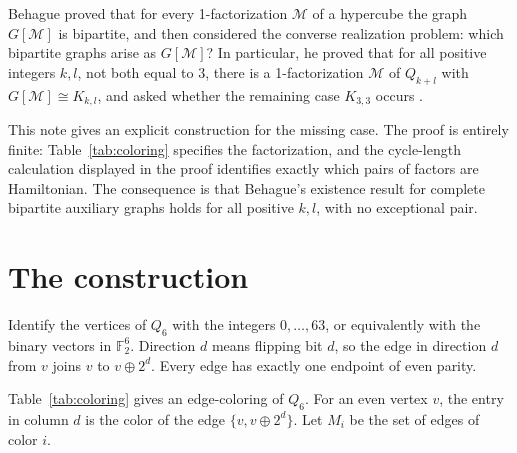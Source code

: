 \documentclass[11pt]{article}
\newcommand{\Q}{Q_6}
\newcommand{\M}{\mathcal M}
\begin{document}
Behague proved that for every 1-factorization \(\M\) of a hypercube the graph
\(G[\M]\) is bipartite, and then considered the converse realization problem:
which bipartite graphs arise as \(G[\M]\)?  In particular, he proved that for
all positive integers \(k,l\), not both equal to \(3\), there is a
1-factorization \(\M\) of \(Q_{k+l}\) with \(G[\M]\cong K_{k,l}\), and asked
whether the remaining case \(K_{3,3}\) occurs \cite[Theorem 2 and Open Problem
8]{behague}.

This note gives an explicit construction for the missing case.  The proof is
entirely finite: Table~\ref{tab:coloring} specifies the factorization, and the
cycle-length calculation displayed in the proof identifies exactly which
pairs of factors are Hamiltonian.  The consequence is that Behague's existence
result for complete bipartite auxiliary graphs holds for all positive
\(k,l\), with no exceptional pair.

\section{The construction}

Identify the vertices of \(\Q\) with the integers \(0,\dots,63\), or
equivalently with the binary vectors in \(\mathbb F_2^6\).  Direction \(d\)
means flipping bit \(d\), so the edge in direction \(d\) from \(v\) joins
\(v\) to \(v\oplus 2^d\).  Every edge has exactly one endpoint of even parity.

Table~\ref{tab:coloring} gives an edge-coloring of \(\Q\).  For an even vertex
\(v\), the entry in column \(d\) is the color of the edge
\(\{v,v\oplus 2^d\}\).  Let \(M_i\) be the set of edges of color \(i\).
\end{document}
